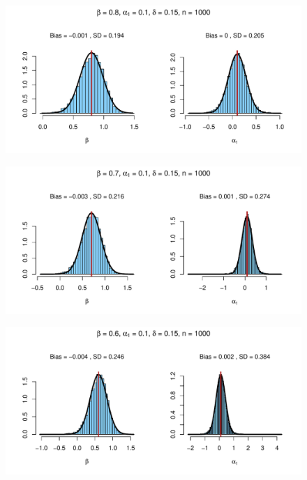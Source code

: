 \documentclass{beamer}
\begin{document}
\begin{frame}[plain,c]

  \begin{figure}[h]
    \centering
    \includegraphics[width=\textwidth]{Rplot6}
  \end{figure}

\end{frame}
\begin{frame}[plain,c]

  \begin{figure}[h]
    \centering
    \includegraphics[width=\textwidth]{Rplot7}
  \end{figure}

\end{frame}
\begin{frame}[plain,c]

  \begin{figure}[h]
    \centering
    \includegraphics[width=\textwidth]{Rplot8}
  \end{figure}

\end{frame}
\end{document}
